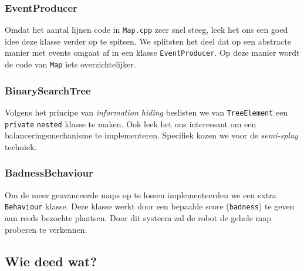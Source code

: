 \documentclass[a4paper]{article}
\begin{document}
\subsubsection*{EventProducer}
Omdat het aantal lijnen code in \verb#Map.cpp# zeer snel steeg, leek het ons een
goed idee deze klasse verder op te spitsen. We splitsten het deel dat op een
abstracte manier met events omgaat af in een klasse \verb#EventProducer#. Op
deze manier wordt de code van \verb#Map# iets overzichtelijker.

\subsubsection*{BinarySearchTree}
Volgens het principe van \emph{information hiding} beslisten we van
\verb#TreeElement# een \verb#private# \verb#nested# klasse te maken. Ook leek
het ons interessant om een balanceringsmechanisme te implementeren. Specifiek
kozen we voor de \emph{semi-splay} techniek.

\subsubsection*{BadnessBehaviour}
Om de meer geavanceerde maps op te lossen implementeerden we een extra
\verb#Behaviour# klasse. Deze klasse werkt door een bepaalde score
(\verb#badness#) te geven aan reeds bezochte plaatsen. Door dit systeem zal
de robot de gehele map proberen te verkennen.

\subsection{Wie deed wat?}
\end{document}
